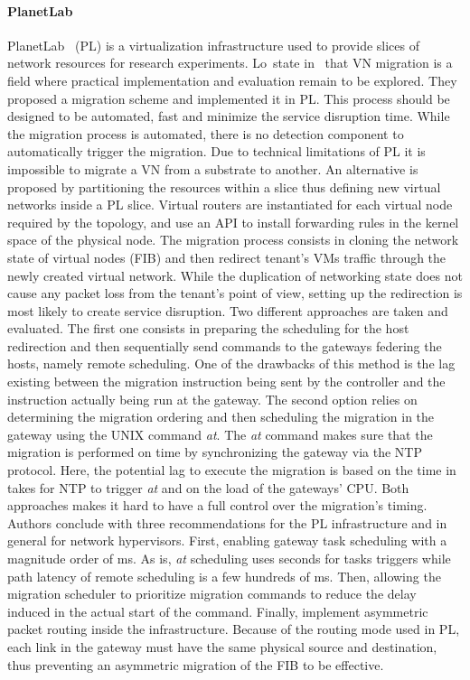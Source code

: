 \paragraph{PlanetLab} PlanetLab~\cite{planetlab} (PL) is a virtualization infrastructure used to provide slices of network resources for research experiments. Lo~\etal state in~\cite{Lo2014} that VN migration is a field where practical implementation and evaluation remain to be explored. They proposed a migration scheme and implemented it in PL. This process should be designed to be automated, fast and minimize the service disruption time. While the migration process is automated, there is no detection component to automatically trigger the migration. Due to technical limitations of PL it is impossible to migrate a VN from a substrate to another. An alternative is proposed by partitioning the resources within a slice thus defining new virtual networks inside a PL slice. Virtual routers are instantiated for each virtual node required by the topology, and use an API to install forwarding rules in the kernel space of the physical node. 
The migration process consists in cloning the network state of virtual nodes (\ie FIB) and then  redirect tenant's VMs traffic through the newly created virtual network.
While the duplication of networking state does not cause any packet loss from the tenant's point of view, setting up the redirection is most likely to create service disruption.
Two different approaches are taken and evaluated. The first one consists in preparing the scheduling for the host redirection and then sequentially send commands to the gateways federing the hosts, namely remote scheduling.
One of the drawbacks of this method is the lag existing between the migration instruction being sent by the controller and the instruction actually being run at the gateway.
The second option relies on determining the migration ordering and then scheduling the migration in the gateway using the UNIX command \textit{at}. The \textit{at} command makes sure that the migration is performed on time by synchronizing the gateway via the NTP protocol. Here, the potential lag to execute the migration is based on the time in takes for NTP to trigger \textit{at} and on the load of the gateways' CPU.
Both approaches makes it hard to have a full control over the migration's timing.
Authors conclude with three recommendations for the PL infrastructure and in general for network hypervisors.
First, enabling gateway task scheduling with a magnitude order of ms. As is, \textit{at} scheduling uses seconds for tasks triggers while path latency of remote scheduling is a few hundreds of ms.
Then, allowing the migration scheduler to prioritize migration commands to reduce the delay induced in the actual start of the command.
Finally, implement asymmetric packet routing inside the infrastructure.
Because of the routing mode used in PL, each link in the gateway must have the same physical source and destination, thus preventing an asymmetric migration of the FIB to be effective. 

